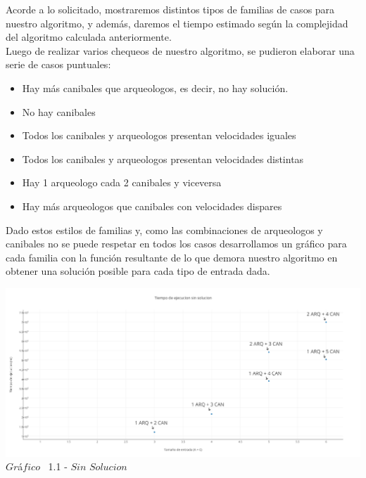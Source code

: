 \indent Acorde a lo solicitado, mostraremos distintos tipos de familias de casos para nuestro algoritmo, y adem\'as, daremos el tiempo estimado 
seg\'un la complejidad del algoritmo calculada anteriormente.\\

Luego de realizar varios chequeos de nuestro algoritmo, se pudieron elaborar una serie de casos puntuales:

\begin{itemize}
\item Hay m\'as canibales que arqueologos, es decir, no hay soluci\'on.
\item No hay canibales
\item Todos los canibales y arqueologos presentan velocidades iguales
\item Todos los canibales y arqueologos presentan velocidades distintas
\item Hay 1 arqueologo cada 2 canibales y viceversa
\item Hay m\'as arqueologos que canibales con velocidades dispares
\end{itemize}

Dado estos estilos de familias y, como las combinaciones de arqueologos y canibales no se puede respetar en todos los casos desarrollamos un gr\'afico para cada familia con la funci\'on resultante de lo que demora nuestro algoritmo en obtener una soluci\'on posible para cada tipo de entrada dada.

\vspace*{0.3cm} \vspace*{0.3cm}
  \begin{center}
 \includegraphics[scale=0.65]{./EJ1/sinsolucion.png}
 {$Gr$\'a$fico$ \ 1.1 - $Sin$ $Solucion$}
  \end{center}
  \vspace*{0.3cm}
 
